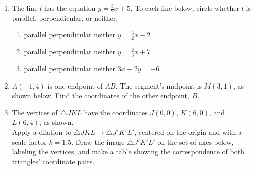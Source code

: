 \documentclass[12pt, twoside]{article}
\begin{document}
\begin{enumerate}
\item The line $l$ has the equation $y=\frac{3}{2}x+5$. To each line below, circle whether $l$ is parallel, perpendicular, or neither.
  \begin{enumerate}
    \item parallel \quad perpendicular \quad neither \qquad $y=\frac{3}{2}x-2$
    \vspace{0.5cm}
    \item parallel \quad perpendicular \quad neither \qquad $y=\frac{2}{3}x+7$
    \vspace{0.5cm}
    \item parallel \quad perpendicular \quad neither \qquad $3x-2y=-6$
    \vspace{2cm}
  \end{enumerate}

\item $A(-1,4)$ is one endpoint of $\overline{AB}$. The segment's midpoint is $M(3,1)$, as shown below. Find the coordinates of the other endpoint, $B$.
    \begin{flushright}
    \end{flushright}

\newpage
\item The vertices of $\triangle JKL$ have the coordinates $J(0,0)$, $K(6,0)$, and $L(6,4)$, as shown. \\[0.25cm]
    Apply a dilation to $\triangle JKL \rightarrow \triangle J'K'L'$, centered on the origin and with a scale factor $k=1.5$. Draw the image $\triangle J'K'L'$ on the set of axes below, labeling the vertices, and make a table showing the correspondence of both triangles' coordinate pairs.
      \begin{flushright}
      \end{flushright}


\end{enumerate}
\end{document}
